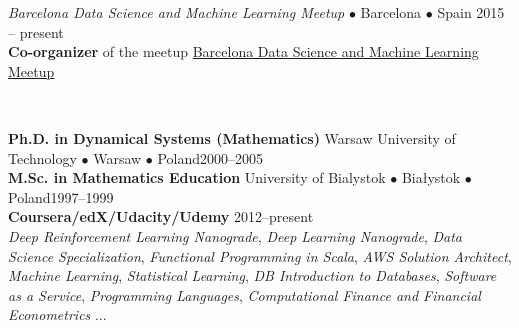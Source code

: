 \documentclass[a4paper, oneside]{scrreprt}
\begin{document}
\vspace{-0.3cm}

\noindent{}\textit{Barcelona Data Science and Machine Learning Meetup}
$\bullet$ Barcelona $\bullet$ Spain \hfill 2015 -- present\\
\noindent  \textbf{Co-organizer} of the meetup
  \href{https://www.meetup.com/es-ES/barcelona-data-science-machine-learning/}
  {Barcelona Data Science and Machine Learning Meetup}

\vspace{-0.1cm}
\noindent\makebox[\linewidth]{\rule{\textwidth}{0.4pt}}


\newpage

\ \\

\vspace{1.8cm}

\noindent\makebox[\linewidth]{\rule{\textwidth}{0.4pt}}


\vspace{0.2cm}

\noindent\textbf{Ph.D. in Dynamical Systems (Mathematics)} Warsaw University of Technology $\bullet$ Warsaw $\bullet$ Poland\hfill 2000--2005\\
\noindent\textbf{M.Sc. in Mathematics Education} University of Bialystok $\bullet$ Białystok $\bullet$ Poland\hfill 1997--1999\\
\noindent\textbf{Coursera/edX/Udacity/Udemy} \hfill 2012--present\\
\emph{Deep Reinforcement Learning Nanograde}, 
\emph{Deep Learning Nanograde}, \emph{Data Science Specialization}, \emph{Functional Programming in Scala}, 
\emph{AWS Solution Architect}, 
\emph{Machine Learning},  \emph{Statistical Learning}, 
\emph{DB Introduction to Databases}, \emph{Software as a Service}, 
\emph{Programming Languages}, 
\emph{Computational Finance and Financial Econometrics} ... \\
\noindent\makebox[\linewidth]{\rule{\textwidth}{0.4pt}}

\vspace{0.2cm}

\end{document}
